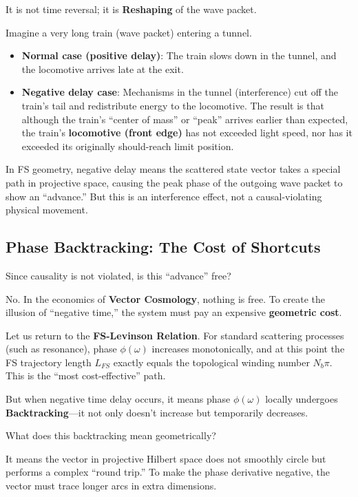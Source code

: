 It is not time reversal; it is \textbf{Reshaping} of the wave packet.

Imagine a very long train (wave packet) entering a tunnel.

\begin{itemize}
\item \textbf{Normal case (positive delay)}: The train slows down in the tunnel, and the locomotive arrives late at the exit.

\item \textbf{Negative delay case}: Mechanisms in the tunnel (interference) cut off the train's tail and redistribute energy to the locomotive. The result is that although the train's ``center of mass'' or ``peak'' arrives earlier than expected, the train's \textbf{locomotive (front edge)} has not exceeded light speed, nor has it exceeded its originally should-reach limit position.
\end{itemize}

In FS geometry, negative delay means the scattered state vector takes a special path in projective space, causing the peak phase of the outgoing wave packet to show an ``advance.'' But this is an interference effect, not a causal-violating physical movement.

\subsection{Phase Backtracking: The Cost of Shortcuts}

Since causality is not violated, is this ``advance'' free?

No. In the economics of \textbf{Vector Cosmology}, nothing is free. To create the illusion of ``negative time,'' the system must pay an expensive \textbf{geometric cost}.

Let us return to the \textbf{FS-Levinson Relation}. For standard scattering processes (such as resonance), phase $\phi(\omega)$ increases monotonically, and at this point the FS trajectory length $L_{FS}$ exactly equals the topological winding number $N_b \pi$. This is the ``most cost-effective'' path.

But when negative time delay occurs, it means phase $\phi(\omega)$ locally undergoes \textbf{Backtracking}---it not only doesn't increase but temporarily decreases.

What does this backtracking mean geometrically?

It means the vector in projective Hilbert space does not smoothly circle but performs a complex ``round trip.'' To make the phase derivative negative, the vector must trace longer arcs in extra dimensions.

